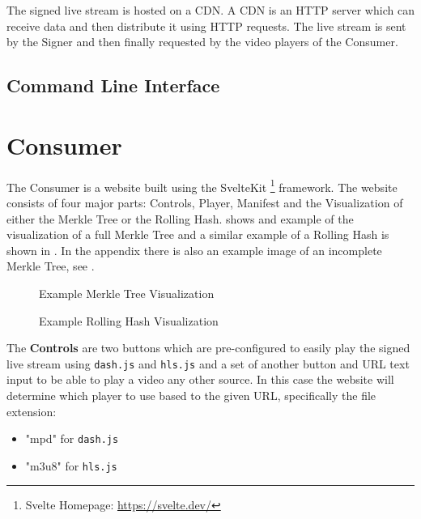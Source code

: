 The signed live stream is hosted on a CDN. A CDN is an HTTP server which can receive data and then distribute it using HTTP requests. The live stream is sent by the Signer and then finally requested by the video players of the Consumer.


\subsection{Command Line Interface\label{sec:cli_cdn}}


\section{Consumer\label{sec:consumer}}

The Consumer is a website built using the SvelteKit \footnote{Svelte Homepage: \url{https://svelte.dev/}} framework. The website consists of four major parts: Controls, Player, Manifest and the Visualization of either the Merkle Tree or the Rolling Hash.  shows and example of the visualization of a full Merkle Tree and a similar example of a Rolling Hash is shown in . In the appendix there is also an example image of an incomplete Merkle Tree, see .

\begin{figure}
    \caption{Example Merkle Tree Visualization}
    \label{fig:merkle_tree}
\end{figure}
\begin{figure}
    \caption{Example Rolling Hash Visualization}
    \label{fig:rolling_hash}
\end{figure}

The \textbf{Controls} are two buttons which are pre-configured to easily play the signed live stream using \texttt{dash.js} and \texttt{hls.js} and a set of another button and URL text input to be able to play a video any other source. In this case the website will determine which player to use based to the given URL, specifically the file extension:

\begin{itemize}
    \item "mpd" for \texttt{dash.js}
    \item "m3u8" for \texttt{hls.js}
\end{itemize}


